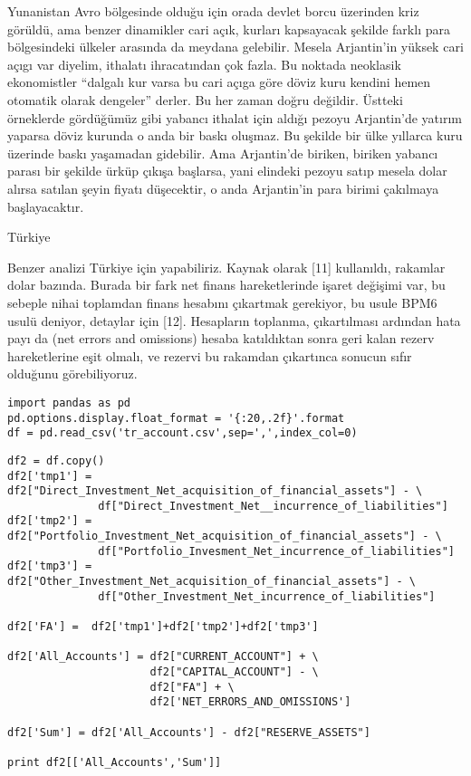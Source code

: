 \documentclass[12pt,fleqn]{article}\usepackage{../../common}
\begin{document}
Yunanistan Avro bölgesinde olduğu için orada devlet borcu üzerinden kriz
görüldü, ama benzer dinamikler cari açık, kurları kapsayacak şekilde farklı
para bölgesindeki ülkeler arasında da meydana gelebilir. Mesela Arjantin'in
yüksek cari açıgı var diyelim, ithalatı ihracatından çok fazla. Bu noktada
neoklasik ekonomistler ``dalgalı kur varsa bu cari açıga göre döviz kuru
kendini hemen otomatik olarak dengeler'' derler. Bu her zaman doğru
değildir. Üstteki örneklerde gördüğümüz gibi yabancı ithalat için aldığı
pezoyu Arjantin'de yatırım yaparsa döviz kurunda o anda bir baskı
oluşmaz. Bu şekilde bir ülke yıllarca kuru üzerinde baskı yaşamadan
gidebilir. Ama Arjantin'de biriken, biriken yabancı parası bir şekilde
ürküp çıkışa başlarsa, yani elindeki pezoyu satıp mesela dolar alırsa
satılan şeyin fiyatı düşecektir, o anda Arjantin'in para birimi çakılmaya
başlayacaktır.

Türkiye

Benzer analizi Türkiye için yapabiliriz. Kaynak olarak [11] kullanıldı,
rakamlar dolar bazında. Burada bir fark net finans hareketlerinde işaret
değişimi var, bu sebeple nihai toplamdan finans hesabını çıkartmak
gerekiyor, bu usule BPM6 usulü deniyor, detaylar için [12]. Hesapların
toplanma, çıkartılması ardından hata payı da (net errors and omissions)
hesaba katıldıktan sonra geri kalan rezerv hareketlerine eşit olmalı, ve
rezervi bu rakamdan çıkartınca sonucun sıfır olduğunu görebiliyoruz.

\begin{verbatim}
import pandas as pd
pd.options.display.float_format = '{:20,.2f}'.format
df = pd.read_csv('tr_account.csv',sep=',',index_col=0)
\end{verbatim}

\begin{verbatim}
df2 = df.copy()
df2['tmp1'] = df2["Direct_Investment_Net_acquisition_of_financial_assets"] - \
              df["Direct_Investment_Net__incurrence_of_liabilities"]
df2['tmp2'] = df2["Portfolio_Investment_Net_acquisition_of_financial_assets"] - \
              df["Portfolio_Invesment_Net_incurrence_of_liabilities"]
df2['tmp3'] = df2["Other_Investment_Net_acquisition_of_financial_assets"] - \
              df["Other_Investment_Net_incurrence_of_liabilities"]

df2['FA'] =  df2['tmp1']+df2['tmp2']+df2['tmp3']

df2['All_Accounts'] = df2["CURRENT_ACCOUNT"] + \
                      df2["CAPITAL_ACCOUNT"] - \
                      df2["FA"] + \
                      df2['NET_ERRORS_AND_OMISSIONS'] 

df2['Sum'] = df2['All_Accounts'] - df2["RESERVE_ASSETS"]

print df2[['All_Accounts','Sum']]
\end{verbatim}
\end{document}
